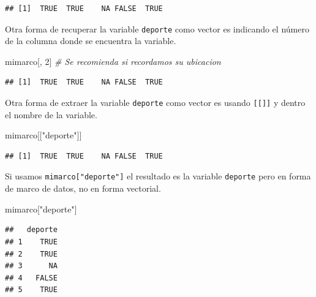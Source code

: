 \documentclass[
]{book}
\makeatletter
\newenvironment{Shaded}{\begin{snugshade}}{\end{snugshade}}
\newcommand{\CommentTok}[1]{\textcolor[rgb]{0.56,0.35,0.01}{\textit{#1}}}
\newcommand{\DecValTok}[1]{\textcolor[rgb]{0.00,0.00,0.81}{#1}}
\newcommand{\NormalTok}[1]{#1}
\newcommand{\SpecialCharTok}[1]{\textcolor[rgb]{0.00,0.00,0.00}{#1}}
\newcommand{\StringTok}[1]{\textcolor[rgb]{0.31,0.60,0.02}{#1}}
\newenvironment{kframe}{%
\medskip{}
\setlength{\fboxsep}{.8em}
 \def\at@end@of@kframe{}%
 \ifinner\ifhmode%
  \def\at@end@of@kframe{\end{minipage}}%
  \begin{minipage}{\columnwidth}%
 \fi\fi%
 \def\FrameCommand##1{\hskip\@totalleftmargin \hskip-\fboxsep
 \colorbox{shadecolor}{##1}\hskip-\fboxsep
     \hskip-\linewidth \hskip-\@totalleftmargin \hskip\columnwidth}%
 \MakeFramed {\advance\hsize-\width
   \@totalleftmargin\z@ \linewidth\hsize
   \@setminipage}}%
 {\par\unskip\endMakeFramed%
 \at@end@of@kframe}
\renewenvironment{Shaded}{\begin{kframe}}{\end{kframe}}
\makeatother
\begin{document}
\begin{Shaded}
\end{Shaded}

\begin{verbatim}
## [1]  TRUE  TRUE    NA FALSE  TRUE
\end{verbatim}

Otra forma de recuperar la variable \texttt{deporte} como vector es indicando el número de la columna donde se encuentra la variable.

\begin{Shaded}
\begin{Highlighting}[]
\NormalTok{mimarco[, }\DecValTok{2}\NormalTok{]  }\CommentTok{\# Se recomienda si recordamos su ubicacion}
\end{Highlighting}
\end{Shaded}

\begin{verbatim}
## [1]  TRUE  TRUE    NA FALSE  TRUE
\end{verbatim}

Otra forma de extraer la variable \texttt{deporte} como vector es usando \texttt{{[}{[}{]}{]}} y dentro el nombre de la variable.

\begin{Shaded}
\begin{Highlighting}[]
\NormalTok{mimarco[[}\StringTok{"deporte"}\NormalTok{]]}
\end{Highlighting}
\end{Shaded}

\begin{verbatim}
## [1]  TRUE  TRUE    NA FALSE  TRUE
\end{verbatim}

Si usamos \texttt{mimarco{[}"deporte"{]}} el resultado es la variable \texttt{deporte} pero en forma de marco de datos, no en forma vectorial.

\begin{Shaded}
\begin{Highlighting}[]
\NormalTok{mimarco[}\StringTok{"deporte"}\NormalTok{]}
\end{Highlighting}
\end{Shaded}

\begin{verbatim}
##   deporte
## 1    TRUE
## 2    TRUE
## 3      NA
## 4   FALSE
## 5    TRUE
\end{verbatim}
\end{document}
